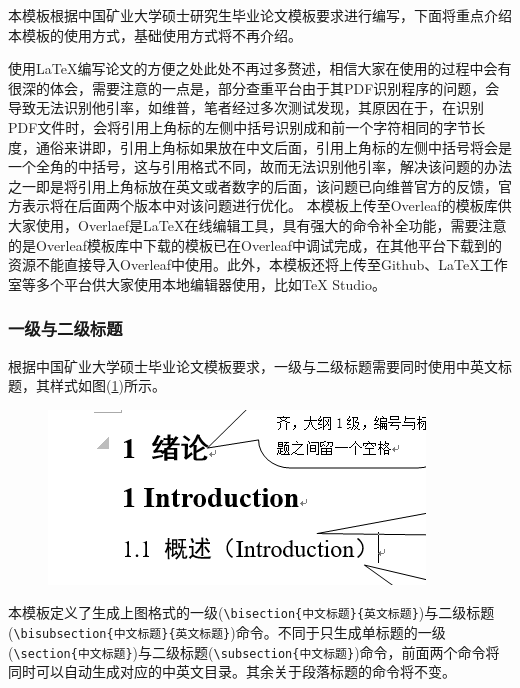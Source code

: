 本模板根据中国矿业大学硕士研究生毕业论文模板要求进行编写，下面将重点介绍本模板的使用方式，基础使用方式将不再介绍。\par
使用\LaTeX 编写论文的方便之处此处不再过多赘述，相信大家在使用的过程中会有很深的体会，需要注意的一点是，部分查重平台由于其PDF识别程序的问题，会导致无法识别他引率，如维普，笔者经过多次测试发现，其原因在于，在识别PDF文件时，会将引用上角标的左侧中括号识别成和前一个字符相同的字节长度，通俗来讲即，引用上角标如果放在中文后面，引用上角标的左侧中括号将会是一个全角的中括号，这与引用格式不同，故而无法识别他引率，解决该问题的办法之一即是将引用上角标放在英文或者数字的后面，该问题已向维普官方的反馈，官方表示将在后面两个版本中对该问题进行优化。
本模板上传至Overleaf的模板库供大家使用，Overlaef是\LaTeX 在线编辑工具，具有强大的命令补全功能，需要注意的是Overleaf模板库中下载的模板已在Overleaf中调试完成，在其他平台下载到的资源不能直接导入Overleaf中使用。此外，本模板还将上传至Github、\LaTeX 工作室等多个平台供大家使用本地编辑器使用，比如TeX Studio。

\subsubsection{一级与二级标题}
根据中国矿业大学硕士毕业论文模板要求，一级与二级标题需要同时使用中英文标题，其样式如图(\ref{fig:headings})所示。\par 
\begin{figure}[htbp]
	\centering
	\includegraphics{pictures/headingsStyle.png}
	\label{fig:headings}
\end{figure}
本模板定义了生成上图格式的一级(\verb|\bisection{中文标题}{英文标题}|)与二级标题(\verb|\bisubsection{中文标题}{英文标题}|)命令。不同于只生成单标题的一级(\verb|\section{中文标题}|)与二级标题(\verb|\subsection{中文标题}|)命令，前面两个命令将同时可以自动生成对应的中英文目录。其余关于段落标题的命令将不变。

